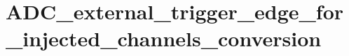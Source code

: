 \hypertarget{group___a_d_c__external__trigger__edge__for__injected__channels__conversion}{\section{A\-D\-C\-\_\-external\-\_\-trigger\-\_\-edge\-\_\-for\-\_\-injected\-\_\-channels\-\_\-conversion}
\label{group___a_d_c__external__trigger__edge__for__injected__channels__conversion}
}
